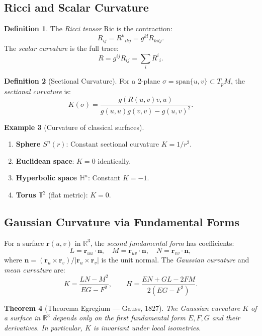 \documentclass[12pt,a4paper]{amsart}
\newtheorem{theorem}{Theorem}[section]
\theoremstyle{definition}
\newtheorem{definition}[theorem]{Definition}
\newtheorem{example}[theorem]{Example}
\begin{document}
\subsection{Ricci and Scalar Curvature}

\begin{definition}
The \emph{Ricci tensor} $\mathrm{Ric}$ is the contraction:
\[
  R_{ij} = R^k{}_{\!ikj} = g^{kl}R_{kilj}.
\]
The \emph{scalar curvature} is the full trace:
\[
  R = g^{ij}R_{ij} = \sum_i R^i{}_i.
\]
\end{definition}

\begin{definition}[Sectional Curvature]
For a 2-plane $\sigma = \mathrm{span}\{u, v\} \subset T_pM$, the
\emph{sectional curvature} is:
\[
  K(\sigma) = \frac{g(R(u,v)v, u)}{g(u,u)g(v,v) - g(u,v)^2}.
\]
\end{definition}

\begin{example}[Curvature of classical surfaces]
\begin{enumerate}[label=(\alph*)]
  \item \textbf{Sphere $S^n(r)$}: Constant sectional curvature $K = 1/r^2$.
  \item \textbf{Euclidean space}: $K = 0$ identically.
  \item \textbf{Hyperbolic space $\mathbb{H}^n$}: Constant $K = -1$.
  \item \textbf{Torus $\mathbb{T}^2$} (flat metric): $K = 0$.
\end{enumerate}
\end{example}

\subsection{Gaussian Curvature via Fundamental Forms}

For a surface $\mathbf{r}(u,v)$ in $\mathbb{R}^3$, the \emph{second
fundamental form} has coefficients:
\[
  L = \mathbf{r}_{uu} \cdot \mathbf{n}, \quad
  M = \mathbf{r}_{uv} \cdot \mathbf{n}, \quad
  N = \mathbf{r}_{vv} \cdot \mathbf{n},
\]
where $\mathbf{n} = (\mathbf{r}_u \times \mathbf{r}_v)/|\mathbf{r}_u \times \mathbf{r}_v|$
is the unit normal. The \emph{Gaussian curvature} and \emph{mean curvature} are:
\[
  K = \frac{LN - M^2}{EG - F^2}, \qquad
  H = \frac{EN + GL - 2FM}{2(EG - F^2)}.
\]

\begin{theorem}[Theorema Egregium --- Gauss, 1827]
The Gaussian curvature $K$ of a surface in $\mathbb{R}^3$ depends only on
the first fundamental form $E, F, G$ and their derivatives. In particular,
$K$ is invariant under local isometries.
\end{theorem}
\end{document}

